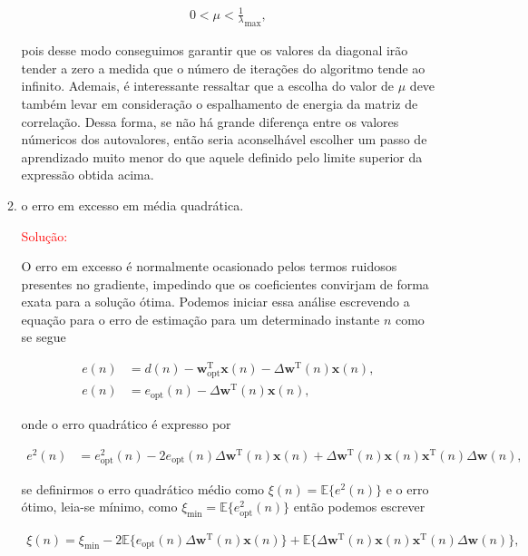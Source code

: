 \documentclass[a4paper,10pt]{article}
\begin{document}
\begin{enumerate}
\begin{enumerate}
						\begin{align}
							0 < \mu < \frac{1}{\lambda}_{\text{max}},
						\end{align}

						pois desse modo conseguimos garantir que os valores da diagonal irão tender a zero a medida que o número de iterações do algoritmo tende ao infinito. Ademais, é interessante ressaltar que a escolha 
						do valor de $\mu$ deve também levar em consideração o espalhamento de energia da matriz de correlação. Dessa forma, se não há grande diferença entre
						os valores númericos dos autovalores, então seria aconselhável escolher um passo de aprendizado muito menor do que aquele definido pelo limite superior da expressão obtida acima.
						
						\item o erro em excesso em média quadrática. 
					
						\textcolor{red}{Solução:}
						
						O erro em excesso é normalmente ocasionado pelos termos ruidosos presentes no gradiente, impedindo que os coeficientes convirjam de forma exata para a solução ótima. 
						Podemos iniciar essa análise escrevendo a equação para o erro de estimação para um determinado instante $n$ como se segue

						\begin{align}
							e(n) &= d(n) - \mathbf{w}^{\text{T}}_{\text{opt}} \mathbf{x}(n) - \Delta \mathbf{w}^{\text{T}}(n) \mathbf{x}(n), \\
							e(n) &= e_{\text{opt}}(n) - \Delta \mathbf{w}^{\text{T}}(n) \mathbf{x}(n),
						\end{align}

						onde o erro quadrático é expresso por

						\begin{align}
							e^{2}(n) &= e^{2}_{\text{opt}}(n) - 2 e_{\text{opt}}(n) \Delta \mathbf{w}^{\text{T}}(n) \mathbf{x}(n) + \Delta \mathbf{w}^{\text{T}}(n) \mathbf{x}(n) \mathbf{x}^{\text{T}}(n) \Delta \mathbf{w}(n) ,
						\end{align}

						se definirmos o erro quadrático médio como $\xi(n) = \mathbb{E}\{e^{2}(n)\}$ e o erro ótimo, leia-se mínimo, como $\xi_{\text{min}} = \mathbb{E}\{e^{2}_{\text{opt}}(n)\}$
						então podemos escrever
						
						\begin{align}
							\xi(n) = \xi_{\text{min}} - 2 \mathbb{E}\{e_{\text{opt}}(n) \Delta \mathbf{w}^{\text{T}}(n) \mathbf{x}(n)\} + \mathbb{E}\{\Delta \mathbf{w}^{\text{T}}(n) \mathbf{x}(n) \mathbf{x}^{\text{T}}(n) \Delta \mathbf{w}(n)\},
						\end{align}


\end{enumerate}
\end{enumerate}
\end{document}
